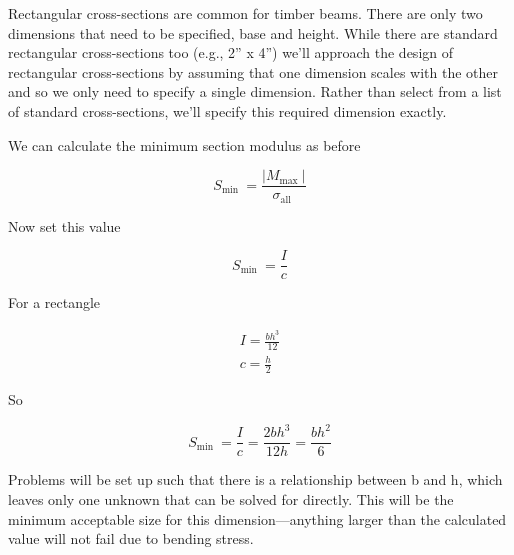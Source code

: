 \documentclass[
  letterpaper,
  DIV=11,
  numbers=noendperiod]{scrreprt}
\begin{document}
Rectangular cross-sections are common for timber beams. There are only
two dimensions that need to be specified, base and height. While there
are standard rectangular cross-sections too (e.g., 2'' x 4'') we'll
approach the design of rectangular cross-sections by assuming that one
dimension scales with the other and so we only need to specify a single
dimension. Rather than select from a list of standard cross-sections,
we'll specify this required dimension exactly.

We can calculate the minimum section modulus as before

\[
S_{\text {min }}=\frac{\left|M_{\text {max }}\right|}{\sigma_{\text {all }}}
\]

Now set this value

\[
S_{\text {min }}=\frac{I}{c}
\]

For a rectangle

\[
\begin{gathered}
I=\frac{b h^3}{12} \\
c=\frac{h}{2}
\end{gathered}
\]

So

\[
S_{\text {min }}=\frac{I}{c}=\frac{2 b h^3}{12 h}=\frac{b h^2}{6}
\]

Problems will be set up such that there is a relationship between b and
h, which leaves only one unknown that can be solved for directly. This
will be the minimum acceptable size for this dimension---anything larger
than the calculated value will not fail due to bending stress.
\end{document}
